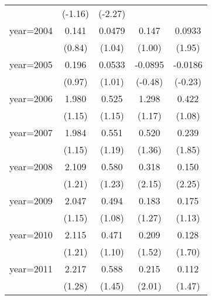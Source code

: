 \begin{table}[htbp]
\begin{tabular}{l*{4}{c}}
                    &     (-1.16)         &     (-2.27)         &                     &                     \\
\addlinespace
year=2004           &       0.141         &      0.0479         &       0.147         &      0.0933         \\
                    &      (0.84)         &      (1.04)         &      (1.00)         &      (1.95)         \\
\addlinespace
year=2005           &       0.196         &      0.0533         &     -0.0895         &     -0.0186         \\
                    &      (0.97)         &      (1.01)         &     (-0.48)         &     (-0.23)         \\
\addlinespace
year=2006           &       1.980         &       0.525         &       1.298         &       0.422         \\
                    &      (1.15)         &      (1.15)         &      (1.17)         &      (1.08)         \\
\addlinespace
year=2007           &       1.984         &       0.551         &       0.520         &       0.239         \\
                    &      (1.15)         &      (1.19)         &      (1.36)         &      (1.85)         \\
\addlinespace
year=2008           &       2.109         &       0.580         &       0.318\sym{*}  &       0.150\sym{*}  \\
                    &      (1.21)         &      (1.23)         &      (2.15)         &      (2.25)         \\
\addlinespace
year=2009           &       2.047         &       0.494         &       0.183         &       0.175         \\
                    &      (1.15)         &      (1.08)         &      (1.27)         &      (1.13)         \\
\addlinespace
year=2010           &       2.115         &       0.471         &       0.209         &       0.128         \\
                    &      (1.21)         &      (1.10)         &      (1.52)         &      (1.70)         \\
\addlinespace
year=2011           &       2.217         &       0.588         &       0.215\sym{*}  &       0.112         \\
                    &      (1.28)         &      (1.45)         &      (2.01)         &      (1.47)         \\

\end{tabular}
\end{table}
